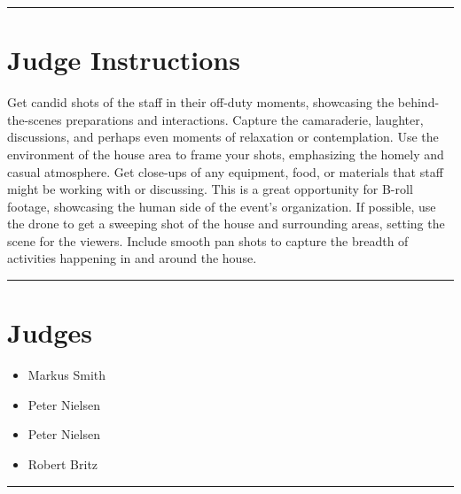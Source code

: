 \documentclass[10pt]{article}
\begin{document}
	\vspace{0.5cm}
	\hrule
	\vspace{0.5cm}

		\section*{Judge Instructions}
		Get candid shots of the staff in their off-duty moments, showcasing the behind-the-scenes preparations and interactions. Capture the camaraderie, laughter, discussions, and perhaps even moments of relaxation or contemplation. Use the environment of the house area to frame your shots, emphasizing the homely and casual atmosphere. Get close-ups of any equipment, food, or materials that staff might be working with or discussing. This is a great opportunity for B-roll footage, showcasing the human side of the event's organization. If possible, use the drone to get a sweeping shot of the house and surrounding areas, setting the scene for the viewers. Include smooth pan shots to capture the breadth of activities happening in and around the house.


\vspace{0.5cm}
	\hrule
	\vspace{0.5cm}
		\section*{\faUsers \: Judges}

		

	\begin{multicols}{2}

		\begin{itemize}
									\item Markus Smith
									\item Peter Nielsen
						\end{itemize}

		\vfill\null
		\columnbreak

		\begin{itemize}
									\item Peter Nielsen
									\item Robert Britz
						\end{itemize}

		\vfill\null

		\end{multicols}



			\vspace{0.5cm}
	\hrule
	\vspace{0.5cm}
\end{document}
